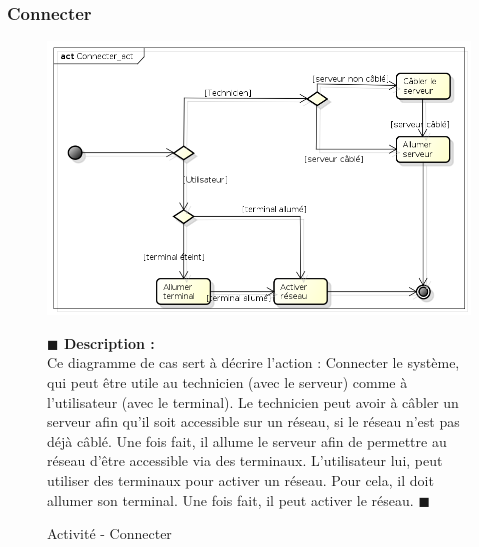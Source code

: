 \documentclass[11pt, titlepage]{report}
\newcommand{\debutDescription}{\noindent\textbf{\textcolor{DescriptionColor}{$\blacksquare$  Description : \\}}}
\newcommand{\finDescription}{\noindent\textcolor{DescriptionColor}{$\blacksquare$}}
\begin{document}
\subsubsection{Connecter}
\begin{figure}[h!]
\begin{center}
\includegraphics[scale=.4]{../images/diagrammes/sysml/activite/connecter.png} 
\caption{Activité - Connecter}
\end{center}
\debutDescription
Ce diagramme de cas sert à décrire l'action : Connecter le système, qui peut être utile au technicien (avec le serveur) comme à l'utilisateur (avec le terminal). Le technicien peut avoir à câbler un serveur afin qu'il soit accessible sur un réseau, si le réseau n'est pas déjà câblé. Une fois fait, il allume le serveur afin de permettre au réseau d'être accessible via des terminaux. L'utilisateur lui, peut utiliser des terminaux pour activer un réseau. Pour cela, il doit allumer son terminal. Une fois fait, il peut activer le réseau.
\finDescription
\end{figure}

\clearpage
\end{document}
